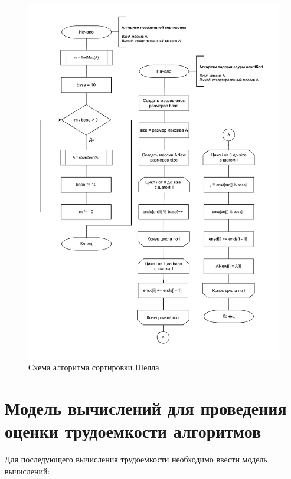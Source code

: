 \begin{figure}[h]
	\centering
	\includegraphics[height=0.9\textheight, page=3]{img/algorithms.pdf}
	\caption{Схема алгоритма сортировки Шелла}
	\label{fig:Shell}
\end{figure}

\clearpage

\section{Модель вычислений для проведения оценки трудоемкости алгоритмов}
Для последующего вычисления трудоемкости необходимо ввести модель вычислений:

